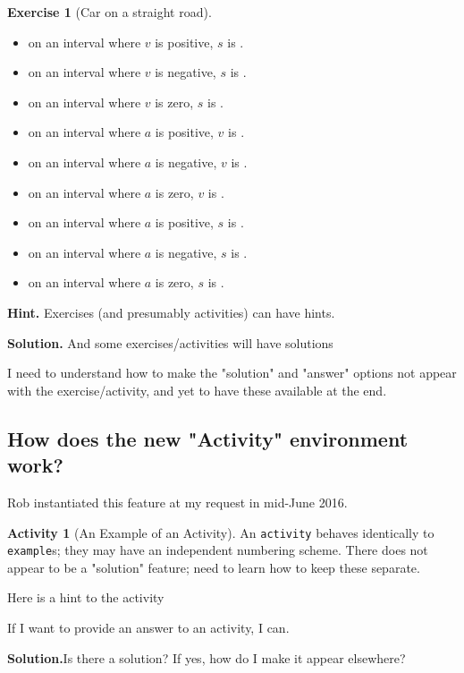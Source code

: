 \documentclass[10pt,]{book}
\theoremstyle{plain}
\theoremstyle{definition}
\theoremstyle{definition}
\newtheorem{activity}[project]{Activity}
\theoremstyle{definition}
\newtheorem{exercise}[theorem]{Exercise}
\begin{document}
\begin{exercise}[Car on a straight road]
\begin{enumerate}
					\begin{itemize}[label=\textbullet]
\item{}on an interval where \(v\) is positive, \(s\) is .\item{}on an interval where \(v\) is negative, \(s\) is .\item{}on an interval where \(v\) is zero, \(s\) is .\item{}on an interval where \(a\) is positive, \(v\) is .\item{}on an interval where \(a\) is negative, \(v\) is .\item{}on an interval where \(a\) is zero, \(v\) is .\item{}on an interval where \(a\) is positive, \(s\) is .\item{}on an interval where \(a\) is negative, \(s\) is .\item{}on an interval where \(a\) is zero, \(s\) is .\end{itemize}
\end{enumerate}
\par\smallskip
\noindent\textbf{Hint.}\hypertarget{hint-2}{}\quad
Exercises (and presumably activities) can have hints.\par\smallskip
\noindent\textbf{Solution.}\hypertarget{solution-1}{}\quad
And some exercises/activities will have solutions\end{exercise}
\par
I need to understand how to make the "solution" and "answer" options not appear with the exercise/activity, and yet to have these available at the end.%
\typeout{************************************************}
\typeout{************************************************}
\subsection[How does the new "Activity" environment work?]{How does the new "Activity" environment work?}\label{subsection-6}
Rob instantiated this feature at my request in mid-June 2016.%
\begin{activity}[An Example of an Activity]\label{sample-activity}
An \lstinline?activity? behaves identically to \lstinline?example?s; they may have an independent numbering scheme.  There does not appear to be a "solution" feature; need to learn how to keep these separate.%

                        	Here is a hint to the activity
                        
                        	If I want to provide an answer to an activity, I can.
                        \par\medskip\noindent%
\textbf{Solution.}\quad  Is there a solution?  If yes, how do I make it appear elsewhere? %
\end{activity}
\typeout{************************************************}
\typeout{************************************************}
\end{document}

